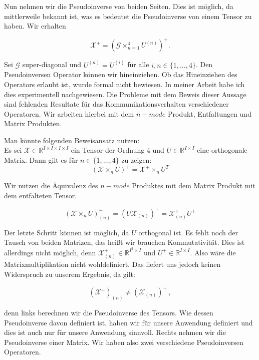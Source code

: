 Nun nehmen wir die Pseudoinverse von beiden Seiten. Dies ist möglich, da mittlerweile bekannt ist, was es bedeutet die Pseudoinverse von einem Tensor zu haben. Wir erhalten

\begin{equation}
\pmb{\mathscr{X}}^{+} = (\pmb{\mathscr{G}} \times_{n=1}^{4} U^{ (n) })^+.
\end{equation}


Sei $\mathcal{G}$ super-diagonal und $U^{(n)}=U^{(i)}$ für alle $i,n \in \{1,\dots,4\}$. Den Pseudoinversen Operator können wir hineinziehen. Ob das Hineinziehen des Operators erlaubt ist, wurde formal nicht bewiesen. In meiner Arbeit habe ich dies experimentell nachgewiesen. Die Probleme mit dem Beweis dieser Aussage sind fehlenden Resultate für das Kommunikationsverhalten verschiedener Operatoren. Wir arbeiten hierbei mit dem $n-mode$ Produkt, Entfaltungen und Matrix Produkten. 

Man könnte folgenden Beweisansatz nutzen: \\
Es sei $\mathscr{X} \in \mathbb{R}^{I \times I \times I \times I}$ ein Tensor der Ordnung 4 und $U \in \mathbb{R}^{I \times I}$ eine orthogonale Matrix.
Dann gilt es für $n \in \{1,\dots,4\}$ zu zeigen:
\begin{equation*}
(\mathscr{X} \times_n U)^+ = \mathscr{X}^+ \times_n U^T 
\end{equation*} 

Wir nutzen die Äquivalenz des $n-mode$ Produktes mit dem Matrix Produkt mit dem entfalteten Tensor.

\begin{equation*}
(\mathscr{X} \times_n U)^+ _{(n)} = ( U \mathscr{X}_{(n)} )^+ = \mathscr{X}_{(n)}^+ U^+
\end{equation*}

Der letzte Schritt können ist möglich, da $U$ orthogonal ist.
Es fehlt noch der Tausch von beiden Matrizen, das heißt wir brauchen Kommutativität.
Dies ist allerdings nicht möglich, denn $\mathscr{X}_{(n)}^+ \in \mathbb{R}^{I^3 \times I}$ und $U^+ \in \mathbb{R}^{I \times I}$. Also wäre die Matrixmultiplikation nicht wohldefiniert. Das liefert uns jedoch keinen Widerspruch zu unserem Ergebnis, da gilt:

\begin{equation*}
(\mathscr{X}^+)_{(n)} \neq (\mathscr{X}_{(n)})^+ \,,
\end{equation*}

denn links berechnen wir die Pseudoinverse des Tensors. Wie dessen Pseudoinverse davon definiert ist, haben wir für unsere Anwendung definiert und dies ist auch nur für unsere Anwendung sinnvoll. Rechts nehmen wir die Pseudoinverse einer Matrix. Wir haben also zwei verschiedene Pseudoinversen Operatoren.

